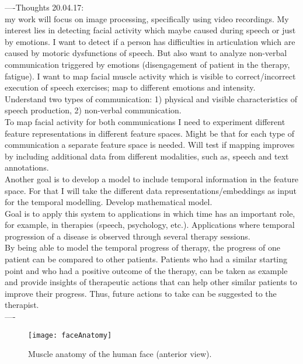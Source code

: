 ----Thoughts 20.04.17:\\
my work will focus on image processing, specifically using video recordings. My interest lies in detecting facial activity which maybe caused during speech or just  by emotions. I want to detect if a person has difficulties in articulation which are caused by motoric dysfunctions of speech. But also want to analyze non-verbal communication triggered by emotions (disengagement of patient in the therapy, fatigue). I want to map facial muscle activity which is visible to correct/incorrect execution of speech exercises; map to different emotions and intensity. Understand two types of communication: 1) physical and visible characteristics of speech production, 2) non-verbal communication.\\

To map facial activity for both communications I need to experiment different feature representations in different feature spaces. Might be that for each type of communication a separate feature space is needed. Will test if mapping improves by including additional data from different modalities, such as, speech and text annotations. \\

Another goal is to develop a model to include temporal information in the feature space. For that I will take the different data representations/embeddings as input for the temporal modelling. Develop mathematical model.\\

Goal is to apply this system to applications in which time has an important role, for example, in therapies (speech, psychology, etc.). Applications where temporal progression of a disease is observed through several therapy sessions.\\

By being able to model the temporal progress of therapy, the progress of one patient can be compared to other patients. Patients who had a similar starting point and who had a positive outcome of the therapy, can be taken as example and provide insights of therapeutic actions that can help other similar patients to improve their progress. Thus, future actions to take can be suggested to the therapist.   
\\
----\\

\begin{figure}
    \centering
    \texttt{[image: faceAnatomy]}
    \caption{Muscle anatomy of the human face (anterior view).\cite{FaceMuscles}}
    \label{fig:my_label}
\end{figure}


